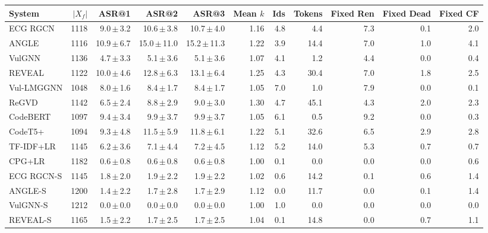 \begin{tabular}{lrrrrrrrrrr}
\toprule
System & $|X_f|$ & ASR@1 & ASR@2 & ASR@3 & Mean $k$ & Ids & Tokens & Fixed Ren & Fixed Dead & Fixed CF \\
\midrule
ECG RGCN & 1118 & 9.0\,$\pm$\,3.2 & 10.6\,$\pm$\,3.8 & 10.7\,$\pm$\,4.0 & 1.16 & 4.8 & 4.4 & 7.3 & 0.1 & 2.0 \\
ANGLE & 1116 & 10.9\,$\pm$\,6.7 & 15.0\,$\pm$\,11.0 & 15.2\,$\pm$\,11.3 & 1.22 & 3.9 & 14.4 & 7.0 & 1.0 & 4.1 \\
VulGNN & 1136 & 4.7\,$\pm$\,3.3 & 5.1\,$\pm$\,3.6 & 5.1\,$\pm$\,3.6 & 1.07 & 4.1 & 1.2 & 4.4 & 0.0 & 0.4 \\
REVEAL & 1122 & 10.0\,$\pm$\,4.6 & 12.8\,$\pm$\,6.3 & 13.1\,$\pm$\,6.4 & 1.25 & 4.3 & 30.4 & 7.0 & 1.8 & 2.5 \\
Vul-LMGGNN & 1048 & 8.0\,$\pm$\,1.6 & 8.4\,$\pm$\,1.7 & 8.4\,$\pm$\,1.7 & 1.05 & 7.0 & 1.0 & 7.9 & 0.0 & 0.1 \\
ReGVD & 1142 & 6.5\,$\pm$\,2.4 & 8.8\,$\pm$\,2.9 & 9.0\,$\pm$\,3.0 & 1.30 & 4.7 & 45.1 & 4.3 & 2.0 & 2.3 \\
CodeBERT & 1097 & 9.4\,$\pm$\,3.4 & 9.9\,$\pm$\,3.7 & 9.9\,$\pm$\,3.7 & 1.05 & 6.1 & 0.5 & 9.2 & 0.0 & 0.3 \\
CodeT5+ & 1094 & 9.3\,$\pm$\,4.8 & 11.5\,$\pm$\,5.9 & 11.8\,$\pm$\,6.1 & 1.22 & 5.1 & 32.6 & 6.5 & 2.9 & 2.8 \\
TF-IDF+LR & 1145 & 6.2\,$\pm$\,3.6 & 7.1\,$\pm$\,4.4 & 7.2\,$\pm$\,4.5 & 1.12 & 5.2 & 14.0 & 5.3 & 0.7 & 0.7 \\
CPG+LR & 1182 & 0.6\,$\pm$\,0.8 & 0.6\,$\pm$\,0.8 & 0.6\,$\pm$\,0.8 & 1.00 & 0.1 & 0.0 & 0.0 & 0.0 & 0.6 \\
ECG RGCN-S & 1145 & 1.8\,$\pm$\,2.0 & 1.9\,$\pm$\,2.2 & 1.9\,$\pm$\,2.2 & 1.02 & 0.6 & 14.2 & 0.1 & 0.6 & 1.4 \\
ANGLE-S & 1200 & 1.4\,$\pm$\,2.2 & 1.7\,$\pm$\,2.8 & 1.7\,$\pm$\,2.9 & 1.12 & 0.0 & 11.7 & 0.0 & 0.1 & 1.4 \\
VulGNN-S & 1212 & 0.0\,$\pm$\,0.0 & 0.0\,$\pm$\,0.0 & 0.0\,$\pm$\,0.0 & 1.00 & 1.0 & 0.0 & 0.0 & 0.0 & 0.0 \\
REVEAL-S & 1165 & 1.5\,$\pm$\,2.2 & 1.7\,$\pm$\,2.5 & 1.7\,$\pm$\,2.5 & 1.04 & 0.1 & 14.8 & 0.0 & 0.7 & 1.1 \\
\bottomrule
\end{tabular}
